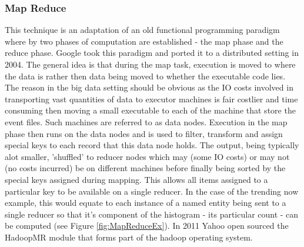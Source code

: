 \documentclass[a4paper,11pt]{scrreprt}
\begin{document}
\subsubsection{Map Reduce}
This technique is an adaptation of an old functional programming paradigm where by two phases of computation are established - the map phase and the reduce phase. Google took this paradigm and ported it to a distributed setting in 2004\cite{mapreduce}. The general idea is that during the map task, execution is moved to where the data is rather then data being moved to whether the executable code lies. The reason in the big data setting should be obvious as the IO costs involved in transporting vast quantities of data to executor machines is fair costlier and time consuming then moving a small executable to each of the machine that store the event files. Such machines are referred to as data nodes. Execution in the map phase then runs on the data nodes and is used to filter, transform and assign special keys to each record that this data node holds. The output, being typically alot smaller, 'shuffled' to reducer nodes which may (some IO costs) or may not (no costs incurred) be on different machines before finally being sorted by the special keys assigned during mapping. This allows all items assigned to a particular key to be available on a single reducer. In the case of the trending now example, this would equate to each instance of a named entity being sent to a single reducer so that it's component of the histogram - its particular count - can be computed (see Figure \ref{fig:MapReduceEx}). In 2011 Yahoo open sourced the HadoopMR\autocite{hadoopMR} module that forms part of the hadoop operating system.\\
\end{document}
